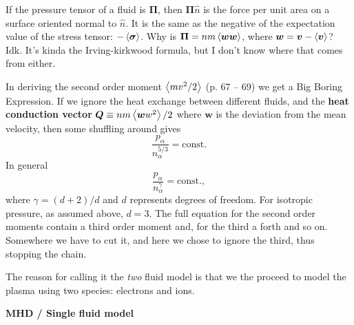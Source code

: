\documentclass[10pt,landscape]{article}
\renewcommand{\vec}{\bm}
\newcommand{\topiccolor}{green}
\renewcommand{\section}[2]{%
	\renewcommand{\topiccolor}{#2}
	\begin{tcolorbox}[boxsep=0.5mm, left=1mm, right=1mm, top=0mm, bottom=0mm,
		colback=#2!30, colframe=#2, arc is angular]%
		\centering \textbf{#1}%
	\end{tcolorbox}%
	\nopagebreak%
}
\newcommand{\cbf}[1]{\textcolor{\topiccolor!80!black}{\textbf{#1}}}
\begin{document}
\begin{multicols*}{3}
\begin{tcolorbox}[title=An aside: wtf is a \textit{pressure tensor}?,
	colframe=\topiccolor!10!white, colback=white, coltitle=\topiccolor]
	If the pressure tensor of a fluid is $\vec \Pi$, then $\vec \Pi \hat n$ is
	the force per unit area on a surface oriented normal to $\hat n$.
	It is the same as the negative of the expectation value of the stress
	tensor: $-\expval{\vec \sigma}$.
	Why is $\vec \Pi = n m \expval{\vec w \vec w}$, where $\vec w = \vec v -
	\expval{\vec v}$? Idk. It's kinda the Irving-kirkwood formula, but I don't
	know where that comes from either.
\end{tcolorbox}

In deriving the second order moment $\left\langle mv^2/2\right\rangle$ (p. 67 -- 69) we get
a Big Boring Expression\texttrademark.
If we ignore the heat exchange between different fluids, and the
\cbf{heat conduction vector}
$\vec Q \equiv n m \expval{\vec w w^2} / 2$
where $\vec w$ is the deviation from the mean velocity,
then some shuffling around gives
\begin{equation*}
	\frac{p_\alpha}{n_\alpha^{5/3}} = \text{const.}
\end{equation*}
In general
\begin{equation}
	\frac{p_\alpha}{n_\alpha^\gamma} = \text{const.}
	\label{eq:state}, 
\end{equation}
where $\gamma=(d+2)/d$ and $d$ represents degrees of freedom. 
For isotropic pressure, as assumed above, $d=3$.
The full equation for the second order moments contain a third order moment and,
for the third a forth and so on.
Somewhere we have to cut it, and here we chose to ignore the third,
thus stopping the chain.

The reason for calling it the \emph{two} fluid model is that we the proceed
to model the plasma using two species: electrons and ions.

\section{MHD / Single fluid model}{lime}


\end{multicols*}
\end{document}
